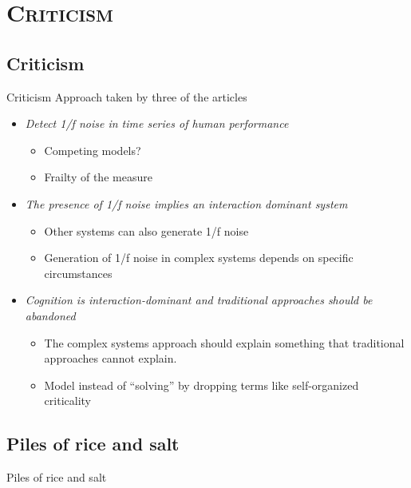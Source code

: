 \documentclass[xcolor=x11names,compress]{beamer}
\renewcommand{\(}{\begin{columns}}
\renewcommand{\)}{\end{columns}}
\newcommand{\<}[1]{\begin{column}{#1}}
\renewcommand{\>}{\end{column}}
\begin{document}
\section{\scshape Criticism}
\subsection{Criticism}
\begin{frame}{Criticism}
    Approach taken by three of the articles
    \begin{itemize}
        \item \emph{Detect 1/f noise in time series of human performance}
            \begin{itemize}
                \item Competing models?
                \item Frailty of the measure
            \end{itemize}
        \item \emph{The presence of 1/f noise implies an interaction dominant system}
            \begin{itemize}
                \item Other systems can also generate 1/f noise
                \item Generation of 1/f noise in complex systems depends on specific circumstances
            \end{itemize}
        \item \emph{Cognition is interaction-dominant and traditional approaches should be abandoned}
            \begin{itemize}
                \item The complex systems approach should explain something that traditional approaches cannot explain.
                \item Model instead of ``solving'' by dropping terms like self-organized criticality
            \end{itemize}
    \end{itemize}
\end{frame}

\subsection{Piles of rice and salt}
\begin{frame}{Piles of rice and salt}
\end{frame}
\end{document}
